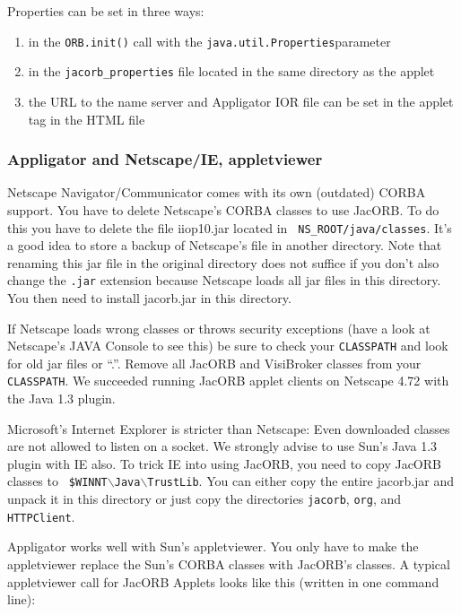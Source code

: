 \documentclass[12pt]{scrbook}
\begin{document}
Properties can be set in three ways:
\begin{enumerate}
     \item   in  the  {\tt ORB.init()}  call  with  the  
     {\tt java.util.Properties}parameter
                 
     \item  in the {\tt  jacorb\_properties} file  located in  the same
     directory as the applet

     \item the URL  to the name server and Appligator  IOR file can be
     set in the applet tag in the HTML file
\end{enumerate}


\subsubsection*{Appligator and Netscape/IE, appletviewer}

Netscape  Navigator/Communicator comes with  its own  (outdated) CORBA
support. You have to delete Netscape's CORBA classes to use JacORB. To
do  this  you have  to  delete the  file  iiop10.jar  located in  {\tt
NS\_ROOT/java/classes}.   It's  a  good  idea  to store  a  backup  of
Netscape's file in another directory. Note that renaming this jar file
in the original directory does  not suffice if you don't also change
the {\tt .jar} extension because  Netscape loads all jar files in this
directory. You then need to install jacorb.jar in this directory.

If Netscape loads wrong classes  or throws security exceptions (have a
look at  Netscape's JAVA Console  to see this)  be sure to  check your
{\tt  CLASSPATH} and  look for  old jar  files or  ``.''.   Remove all
JacORB and VisiBroker classes  from your {\tt CLASSPATH}. We succeeded
running  JacORB applet  clients on  Netscape  4.72 with  the Java  1.3
plugin.

Microsoft's  Internet   Explorer  is  stricter   than  Netscape:  Even
downloaded classes are not allowed  to listen on a socket. We strongly
advise to  use Sun's Java  1.3 plugin with  IE also. To trick  IE into
using   JacORB,   you   need   to   copy  JacORB   classes   to   {\tt
\$WINNT$\backslash$Java$\backslash$TrustLib}.  You can either copy the
entire jacorb.jar  and unpack  it in this  directory or just  copy the
directories {\tt jacorb}, {\tt org}, and {\tt HTTPClient}.

Appligator works well  with Sun's appletviewer. You only  have to make
the  appletviewer  replace  the  Sun's  CORBA  classes  with  JacORB's
classes.  A  typical appletviewer call  for JacORB Applets  looks like
this (written in one command line):
\end{document}
